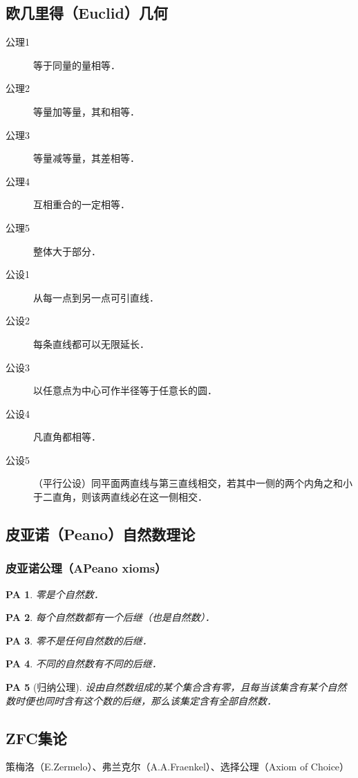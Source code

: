 \subsection{欧几里得（Euclid）几何}

\begin{description}
	\item[公理1] 等于同量的量相等．
	\item[公理2] 等量加等量，其和相等．
	\item[公理3] 等量减等量，其差相等．
	\item[公理4] 互相重合的一定相等．
	\item[公理5] 整体大于部分．
	\item[公设1] 从每一点到另一点可引直线．
	\item[公设2] 每条直线都可以无限延长．
	\item[公设3] 以任意点为中心可作半径等于任意长的圆．
	\item[公设4] 凡直角都相等．
	\item[公设5] （平行公设）同平面两直线与第三直线相交，若其中一侧的两个内角之和小于二直角，则该两直线必在这一侧相交．
\end{description}

\subsection{皮亚诺（Peano）自然数理论}

\subsubsection{皮亚诺公理（APeano xioms）}

\newtheorem{PA}{PA}
\begin{PA}\label{PA:1}
	零是个自然数．
\end{PA}
\begin{PA}\label{PA:2}
	每个自然数都有一个后继（也是自然数）．
\end{PA}
\begin{PA}\label{PA:3}
	零不是任何自然数的后继．
\end{PA}
\begin{PA}\label{PA:4}
	不同的自然数有不同的后继．
\end{PA}
\begin{PA}[归纳公理]\label{PA:5}
	设由自然数组成的某个集合含有零，且每当该集含有某个自然数时便也同时含有这个数的后继，那么该集定含有全部自然数．
\end{PA}

\subsection{ZFC集论}

策梅洛（E.Zermelo）、弗兰克尔（A.A.Fraenkel）、选择公理（Axiom of Choice）
